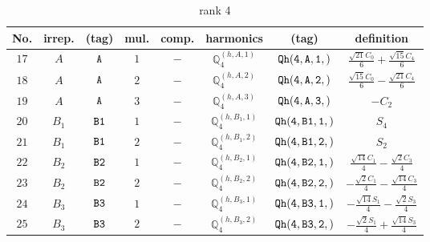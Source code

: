 \documentclass[fleqn,8pt]{jsarticle}
\begin{document}
\begin{table}[ht!]
\begin{center}
\caption{rank 4}
\renewcommand{\arraystretch}{1.3}
\begin{tabular}{cccccccc} \hline \hline
No. & irrep. & (tag) & mul. & comp. & harmonics & (tag) & definition \\ \hline
$ 17 $ & $ A $ & $ {\tt A} $ & $ 1 $ & $ - $ & $ \mathbb{Q}_{4}^{(h,A,1)} $ & $ {\tt Qh(4,A,1,)} $ & $ \frac{\sqrt{21} C_{0}}{6} + \frac{\sqrt{15} C_{4}}{6} $ \\
$ 18 $ & $ A $ & $ {\tt A} $ & $ 2 $ & $ - $ & $ \mathbb{Q}_{4}^{(h,A,2)} $ & $ {\tt Qh(4,A,2,)} $ & $ \frac{\sqrt{15} C_{0}}{6} - \frac{\sqrt{21} C_{4}}{6} $ \\
$ 19 $ & $ A $ & $ {\tt A} $ & $ 3 $ & $ - $ & $ \mathbb{Q}_{4}^{(h,A,3)} $ & $ {\tt Qh(4,A,3,)} $ & $ - C_{2} $ \\
$ 20 $ & $ B_{1} $ & $ {\tt B1} $ & $ 1 $ & $ - $ & $ \mathbb{Q}_{4}^{(h,B_{1},1)} $ & $ {\tt Qh(4,B1,1,)} $ & $ S_{4} $ \\
$ 21 $ & $ B_{1} $ & $ {\tt B1} $ & $ 2 $ & $ - $ & $ \mathbb{Q}_{4}^{(h,B_{1},2)} $ & $ {\tt Qh(4,B1,2,)} $ & $ S_{2} $ \\
$ 22 $ & $ B_{2} $ & $ {\tt B2} $ & $ 1 $ & $ - $ & $ \mathbb{Q}_{4}^{(h,B_{2},1)} $ & $ {\tt Qh(4,B2,1,)} $ & $ \frac{\sqrt{14} C_{1}}{4} - \frac{\sqrt{2} C_{3}}{4} $ \\
$ 23 $ & $ B_{2} $ & $ {\tt B2} $ & $ 2 $ & $ - $ & $ \mathbb{Q}_{4}^{(h,B_{2},2)} $ & $ {\tt Qh(4,B2,2,)} $ & $ - \frac{\sqrt{2} C_{1}}{4} - \frac{\sqrt{14} C_{3}}{4} $ \\
$ 24 $ & $ B_{3} $ & $ {\tt B3} $ & $ 1 $ & $ - $ & $ \mathbb{Q}_{4}^{(h,B_{3},1)} $ & $ {\tt Qh(4,B3,1,)} $ & $ - \frac{\sqrt{14} S_{1}}{4} - \frac{\sqrt{2} S_{3}}{4} $ \\
$ 25 $ & $ B_{3} $ & $ {\tt B3} $ & $ 2 $ & $ - $ & $ \mathbb{Q}_{4}^{(h,B_{3},2)} $ & $ {\tt Qh(4,B3,2,)} $ & $ - \frac{\sqrt{2} S_{1}}{4} + \frac{\sqrt{14} S_{3}}{4} $ \\
 \hline \hline
\end{tabular}
\end{center}
\end{table}
\end{document}
